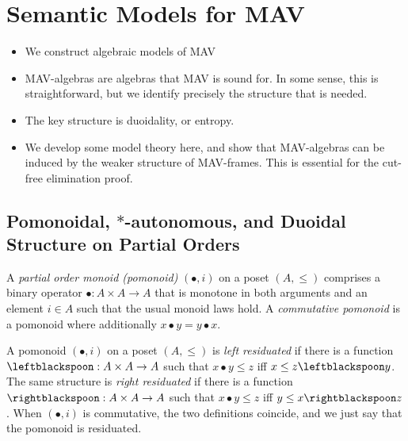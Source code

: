 \section{Semantic Models for MAV}\label{sec:mav-semantics}

\newcommand{\LowerSet}[1]{\widehat{#1}}
\newcommand{\Day}[1]{\mathop{\widehat{#1}}}
\newcommand{\ClosedLowerSet}[1]{\widehat{#1}^+}
\newcommand{\ClosedDay}[1]{\mathop{\widehat{#1}^+}}
\newcommand{\Chu}{\mathrm{Chu}}
\newcommand{\op}{\mathrm{op}}


\begin{itemize}
\item We construct algebraic models of MAV
\item MAV-algebras are algebras that MAV is sound for. In some
  sense, this is straightforward, but we identify precisely the
  structure that is needed.
\item The key structure is duoidality, or entropy.
\item We develop some model theory here, and show that MAV-algebras
  can be induced by the weaker structure of MAV-frames. This is
  essential for the cut-free elimination proof.
\end{itemize}

\subsection{Pomonoidal, $*$-autonomous, and Duoidal Structure on Partial Orders}

\begin{definition}
  A \emph{partial order monoid (pomonoid)} $(\bullet, i)$ on a poset
  $(A, \leq)$ comprises a binary operator $\bullet : A \times A \to A$
  that is monotone in both arguments and an element $i \in A$ such
  that the usual monoid laws hold. A \emph{commutative pomonoid} is a
  pomonoid where additionally $x \bullet y = y \bullet x$.
\end{definition}

\begin{definition}
  A pomonoid $(\bullet, i)$ on a poset $(A, \leq)$ is \emph{left
    residuated} if there is a function
  $\leftblackspoon : A \times A \to A$ such that $x \bullet y \leq z$
  iff $x \leq z \leftblackspoon y$. The same structure is \emph{right
    residuated} if there is a function
  $\rightblackspoon : A \times A \to A$ such that $x \bullet y \leq z$
  iff $y \leq x \rightblackspoon z$. When $(\bullet, i)$ is
  commutative, the two definitions coincide, and we just say that the
  pomonoid is residuated.
\end{definition}

